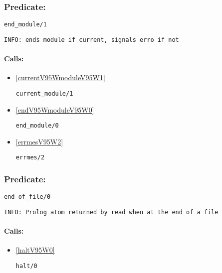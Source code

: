 \subsubsection{Predicate:} \label{endV95WmoduleV95W1}

\begin{verbatim}
end_module/1
\end{verbatim}

{\small \begin{verbatim}
INFO: ends module if current, signals erro if not

\end{verbatim}}
\paragraph{Calls:} 
\begin{itemize}
\item \ref{currentV95WmoduleV95W1} 
\begin{verbatim}
current_module/1
\end{verbatim}

\item \ref{endV95WmoduleV95W0} 
\begin{verbatim}
end_module/0
\end{verbatim}

\item \ref{errmesV95W2} 
\begin{verbatim}
errmes/2
\end{verbatim}

\end{itemize}

\subsubsection{Predicate:} \label{endV95WofV95WfileV95W0}

\begin{verbatim}
end_of_file/0
\end{verbatim}

{\small \begin{verbatim}
INFO: Prolog atom returned by read when at the end of a file

\end{verbatim}}
\paragraph{Calls:} 
\begin{itemize}
\item \ref{haltV95W0} 
\begin{verbatim}
halt/0
\end{verbatim}

\end{itemize}

